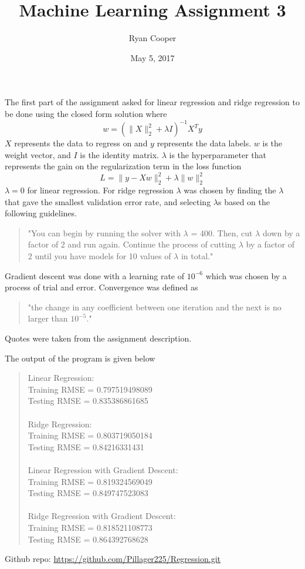 \documentclass{article}
\newcommand*\Ltwo[1]{\lVert #1 \rVert^{2}_{2}}
\begin{document}
\title{Machine Learning Assignment 3}
\author{Ryan Cooper}
\date{May 5, 2017}
\maketitle
The first part of the assignment asked for linear regression and ridge regression to be done using the closed form solution where \[w=(\Ltwo{X}+\lambda I)^{-1}X^{T}y\] \(X\) represents the data to regress on and \(y\) represents the data labels. \(w\) is the weight vector, and \(I\) is the identity matrix. \(\lambda\) is the hyperparameter that represents the gain on the regularization term in the loss function \[L=\Ltwo{y-Xw} + \lambda \Ltwo{w}\]
\(\lambda=0\) for linear regression. For ridge regression \(\lambda\) was chosen by finding the \(\lambda\) that gave the smallest validation error rate, and selecting \(\lambda\)s based on the following guidelines.
\begin{quote}
"You can begin by running the solver with \(\lambda\) = 400. Then, cut \(\lambda\) down by a factor of 2 and run again. Continue the process of cutting \(\lambda\) by a factor of 2 until you have models for 10 values of \(\lambda\) in total."
\end{quote}
Gradient descent was done with a learning rate of \(10^{-6}\) which was chosen by a process of trial and error. Convergence was defined as 
\begin{quote}
"the change in any coefficient between one iteration and the next is no larger than \(10^{-5}\)."
\end{quote}
Quotes were taken from the assignment description.
\par
The output of the program is given below
\begin{quote}
Linear Regression: \\
Training RMSE = 0.797519498089 \\
Testing RMSE = 0.835386861685 \\
\\
Ridge Regression:\\ 
Training RMSE = 0.803719050184\\
Testing RMSE = 0.84216331431\\
\\
Linear Regression with Gradient Descent:\\
Training RMSE = 0.819324569049\\
Testing RMSE = 0.849747523083\\
\\
Ridge Regression with Gradient Descent:\\
Training RMSE = 0.818521108773\\
Testing RMSE = 0.864392768628\\
\end{quote}
\vspace{.2cm}
Github repo: \url{https://github.com/Pillager225/Regression.git}
\end{document}
